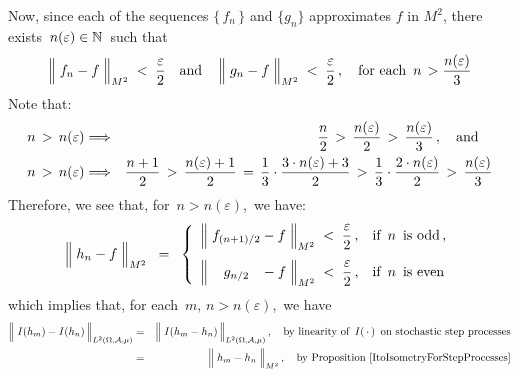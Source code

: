 \begin{enumerate}
	Now, since each of the sequences $\{\,f_{n}\,\}$ and $\{g_{n}\}$ approximates $f$ in $M^{2}$,
	there exists \,$n(\varepsilon) \in \mathbb{N}$\, such that
	\begin{equation*}
	\left\Vert\; f_{n} \overset{{\color{white}.}}{-} f \;\right\Vert_{M^{2}} \; < \; \dfrac{\varepsilon}{2}
	\quad\textnormal{and}\quad
	\left\Vert\; g_{n} \overset{{\color{white}.}}{-} f \;\right\Vert_{M^{2}} \; < \; \dfrac{\varepsilon}{2}\,,
	\quad\textnormal{for each \,$n \,> \dfrac{n(\varepsilon)}{3}$}
	\end{equation*}
	Note that:
	\begin{eqnarray*}
	n \,>\, n(\varepsilon)
	& \Longrightarrow &
		\dfrac{n}{2} \,>\, \dfrac{n(\varepsilon)}{2} \,>\, \dfrac{n(\varepsilon)}{3}\,,
		\quad\textnormal{and}\quad
	\\
	n \,>\, n(\varepsilon)
	& \Longrightarrow &
		\dfrac{n+1}{2}
		\,>\, \dfrac{n(\varepsilon)+1}{2}
		\,=\, \dfrac{1}{3}\cdot\dfrac{3 \cdot n(\varepsilon)+3}{2}
		\,>\, \dfrac{1}{3}\cdot\dfrac{2 \cdot n(\varepsilon)}{2} 
		\,>\, \dfrac{n(\varepsilon)}{3}
	\end{eqnarray*}
	Therefore, we see that, for \,$n > n(\varepsilon)$,\, we have:
	\begin{equation*}
	\left\Vert\; h_{n} \overset{{\color{white}.}}{-} f \;\right\Vert_{M^{2}}
	\;\; = \;\;
		\left\{\begin{array}{ll}
		\left\Vert\;
			f_{(n+1)/2} \overset{{\color{white}.}}{-} f
			\;\right\Vert_{M^{2}}
		\;<\; \dfrac{\varepsilon}{2}\,, & \textnormal{if \,$n$\, is odd}\,,
		\\
		\overset{{\color{white}1}}{\left\Vert\;
			{\color{white}...}g_{n/2}{\color{white}...} \overset{{\color{white}.}}{-} f
			\;\right\Vert_{M^{2}}}
		\;<\; \dfrac{\varepsilon}{2}\,, & \textnormal{if \,$n$\, is even}
		\end{array}\right.
	\end{equation*}
	which implies that, for each \,$m,\, n > n(\varepsilon)$,\, we have
	\begin{eqnarray*}
	\left\Vert\; I(h_{m}) \overset{{\color{white}.}}{-} I(h_{n}) \,\right\Vert_{L^{2}(\Omega,\mathcal{A},\mu)}
	& = &
		\left\Vert\; I(h_{m} \overset{{\color{white}.}}{-} h_{n}) \,\right\Vert_{L^{2}(\Omega,\mathcal{A},\mu)},
		\quad
		\textnormal{by linearity of \,$I(\,\cdot\,)$\, on stochastic step processes}
	\\
	& = &
		\left\Vert\; h_{m} \overset{{\color{white}.}}{-} h_{n} \;\right\Vert_{M^{2}},
		\quad
		\textnormal{by Proposition \ref{ItoIsometryForStepProcesses}}

\end{eqnarray*}
\end{enumerate}
